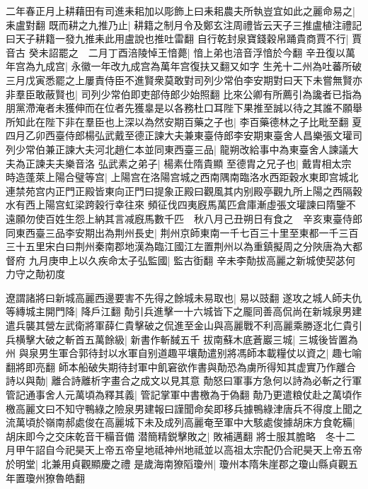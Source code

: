 二年春正月上耕藉田有司進耒耜加以彫飾上曰耒耜農夫所執豈宜如此之麗命易之|{
	耒盧對翻}
既而耕之九推乃止|{
	耕籍之制月令及鄭玄注周禮皆云天子三推盧植注禮記曰天子耕籍一發九推耒此用盧說也推吐雷翻}
自行乾封泉寶錢穀帛踊貴商賈不行|{
	賈音古}
癸未詔罷之　二月丁酉涪陵悼王愔薨|{
	愔上弟也涪音浮愔於今翻}
辛丑復以萬年宫為九成宫|{
	永徽一年改九成宫為萬年宫復扶又翻又如字}
生羌十二州為吐蕃所破三月戊寅悉罷之上屢責侍臣不進賢衆莫敢對司列少常伯李安期對曰天下未嘗無賢亦非羣臣敢蔽賢也|{
	司列少常伯即吏部侍郎少始照翻}
比來公卿有所薦引為讒者已指為朋黨滯淹者未獲伸而在位者先獲辠是以各務杜口耳陛下果推至誠以待之其誰不願舉所知此在陛下非在羣臣也上深以為然安期百藥之子也|{
	李百藥德林之子比毗至翻}
夏四月乙卯西臺侍郎楊弘武戴至德正諫大夫兼東臺侍郎李安期東臺舍人昌樂張文瓘司列少常伯兼正諫大夫河北趙仁本並同東西臺三品|{
	龍朔改給事中為東臺舍人諫議大夫為正諫夫夫樂音洛}
弘武素之弟子|{
	楊素仕隋貴顯}
至德胄之兄子也|{
	戴胄相太宗}
時造蓬萊上陽合璧等宫|{
	上陽宫在洛陽宫城之西南隅南臨洛水西距穀水東即宫城北連禁苑宫内正門正殿皆東向正門曰提象正殿曰觀風其内别殿亭觀九所上陽之西隔穀水有西上陽宫虹梁跨穀行幸往來}
頻征伐四夷廐馬萬匹倉庫漸虛張文瓘諫曰隋鑒不遠願勿使百姓生怨上納其言减廐馬數千匹　秋八月己丑朔日有食之　辛亥東臺侍郎同東西臺三品李安期出為荆州長史|{
	荆州京師東南一千七百三十里至東都一千三百三十五里宋白曰荆州秦南郡地漢為臨江國江左置荆州以為重鎮擬周之分陜唐為大都督府}
九月庚申上以久疾命太子弘監國|{
	監古衘翻}
辛未李勣拔高麗之新城使契苾何力守之勣初度

遼謂諸將曰新城高麗西邊要害不先得之餘城未易取也|{
	易以豉翻}
遂攻之城人師夫仇等縳城主開門降|{
	降戶江翻}
勣引兵進擊一十六城皆下之龎同善高侃尚在新城泉男建遣兵襲其營左武衛將軍薛仁貴擊破之侃進至金山與高麗戰不利高麗乘勝逐北仁貴引兵横擊大破之斬首五萬餘級|{
	新書作斬馘五千}
拔南蘇木底蒼巖三城|{
	三城後皆置為州}
與泉男生軍合郭待封以水軍自别道趣平壤勣遣别將馮師本載糧仗以資之|{
	趣七喻翻將即亮翻}
師本船破失期待封軍中飢窘欲作書與勣恐為虜所得知其虚實乃作離合詩以與勣|{
	離合詩離析字畫合之成文以見其意}
勣怒曰軍事方急何以詩為必斬之行軍管記通事舍人元萬頃為釋其義|{
	管記掌軍中書檄為于偽翻}
勣乃更遣粮仗赴之萬頃作檄高麗文曰不知守鴨綠之險泉男建報曰謹聞命矣即移兵據鴨綠津唐兵不得度上聞之流萬頃於嶺南郝處俊在高麗城下未及成列高麗奄至軍中大駭處俊據胡床方食乾糒|{
	胡床即今之交床乾音干糒音備}
潜簡精鋭擊敗之|{
	敗補邁翻}
將士服其膽略　冬十二月甲午詔自今祀昊天上帝五帝皇地祗神州地祗並以高祖太宗配仍合祀昊天上帝五帝於明堂|{
	北兼用貞觀顯慶之禮}
是歲海南獠䧟瓊州|{
	瓊州本隋朱崖郡之瓊山縣貞觀五年置瓊州獠魯皓翻}


